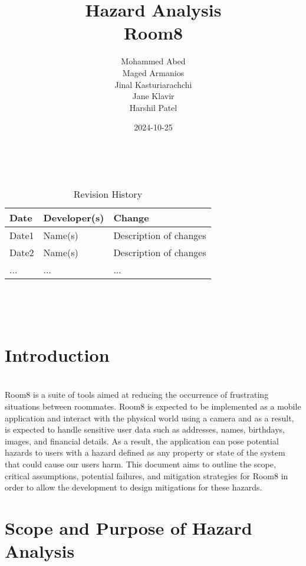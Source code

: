 \documentclass{article}
\title{Hazard Analysis\\Room8}
\author{Mohammed Abed \\ 
        Maged Armanios\\
        Jinal Kasturiarachchi\\
        Jane Klavir\\
        Harshil Patel\\}
\date{2024-10-25}
\begin{document}
\maketitle
\thispagestyle{empty}

~\newpage


\begin{table}[hp]
\caption{Revision History} \label{TblRevisionHistory}
\begin{tabularx}{\textwidth}{llX}
\toprule
\textbf{Date} & \textbf{Developer(s)} & \textbf{Change}\\
\midrule
Date1 & Name(s) & Description of changes\\
Date2 & Name(s) & Description of changes\\
... & ... & ...\\
\bottomrule
\end{tabularx}
\end{table}

~\newpage

\tableofcontents

~\newpage



\section{Introduction}

\\
Room8 is a suite of tools aimed at reducing the occurrence of frustrating situations between roommates. Room8 is expected to be implemented as a mobile application and interact with the physical world using a camera and as a result, is expected to handle sensitive user data such as addresses, names, birthdays, images, and financial details. As a result, the application can pose potential hazards to users with a hazard defined as any property or state of the system that could cause our users harm. This document aims to outline the scope, critical assumptions, potential failures, and mitigation strategies for Room8 in order to allow the development to design mitigations for these hazards.


\section{Scope and Purpose of Hazard Analysis}
\end{document}
